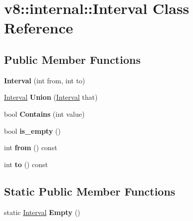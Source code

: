 \hypertarget{classv8_1_1internal_1_1_interval}{}\section{v8\+:\+:internal\+:\+:Interval Class Reference}
\label{classv8_1_1internal_1_1_interval}
\subsection*{Public Member Functions}
\begin{DoxyCompactItemize}
\item 
{\bfseries Interval} (int from, int to)\hypertarget{classv8_1_1internal_1_1_interval_a1dd35e0358bb18930823d546ad01ac30}{}\label{classv8_1_1internal_1_1_interval_a1dd35e0358bb18930823d546ad01ac30}

\item 
\hyperlink{classv8_1_1internal_1_1_interval}{Interval} {\bfseries Union} (\hyperlink{classv8_1_1internal_1_1_interval}{Interval} that)\hypertarget{classv8_1_1internal_1_1_interval_a8178f50f9964a63a34c2ac53c3732426}{}\label{classv8_1_1internal_1_1_interval_a8178f50f9964a63a34c2ac53c3732426}

\item 
bool {\bfseries Contains} (int value)\hypertarget{classv8_1_1internal_1_1_interval_ada3527bcada1af9754fbff580738ae20}{}\label{classv8_1_1internal_1_1_interval_ada3527bcada1af9754fbff580738ae20}

\item 
bool {\bfseries is\+\_\+empty} ()\hypertarget{classv8_1_1internal_1_1_interval_ad0a7a8fff4666d6de2e2989115752582}{}\label{classv8_1_1internal_1_1_interval_ad0a7a8fff4666d6de2e2989115752582}

\item 
int {\bfseries from} () const \hypertarget{classv8_1_1internal_1_1_interval_a1a72362b822c8c8c185fc6d643166bfd}{}\label{classv8_1_1internal_1_1_interval_a1a72362b822c8c8c185fc6d643166bfd}

\item 
int {\bfseries to} () const \hypertarget{classv8_1_1internal_1_1_interval_a816dc198aca1bff99cf5703830a7abc3}{}\label{classv8_1_1internal_1_1_interval_a816dc198aca1bff99cf5703830a7abc3}

\end{DoxyCompactItemize}
\subsection*{Static Public Member Functions}
\begin{DoxyCompactItemize}
\item 
static \hyperlink{classv8_1_1internal_1_1_interval}{Interval} {\bfseries Empty} ()\hypertarget{classv8_1_1internal_1_1_interval_a6131d294464930b38182ae30ac0e7bdf}{}\label{classv8_1_1internal_1_1_interval_a6131d294464930b38182ae30ac0e7bdf}

\end{DoxyCompactItemize}
